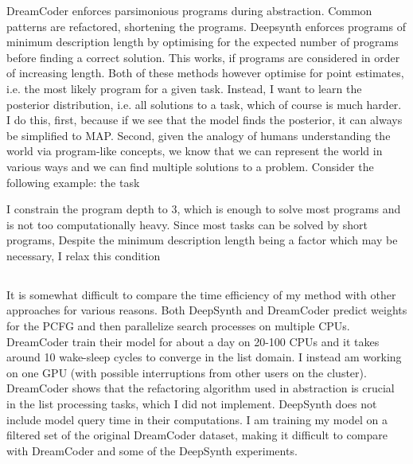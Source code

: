 
DreamCoder enforces parsimonious programs during abstraction. Common patterns are refactored, shortening the programs. Deepsynth enforces programs of minimum description length by optimising for the expected number of programs before finding a correct solution. This works, if programs are considered in order of increasing length. Both of these methods however optimise for point estimates, i.e. the most likely program for a given task. Instead, I want to learn the posterior distribution, i.e. all solutions to a task, which of course is much harder.
I do this, first, because if we see that the model finds the posterior, it can always be simplified to MAP. Second, given the analogy of humans understanding the world via program-like concepts, we know that we can represent the world in various ways and we can find multiple solutions to a problem. Consider the following example: the task 


I constrain the program depth to 3, which is enough to solve most programs and is not too computationally heavy.
Since most tasks can be solved by short programs, 
Despite the minimum description length being a factor which may be necessary, I relax this condition






\subsection{}


\subsection{}
It is somewhat difficult to compare the time efficiency of my method with other approaches for various reasons. 
Both DeepSynth and DreamCoder predict weights for the PCFG and then parallelize search processes on multiple CPUs. DreamCoder train their model for about a day on 20-100 CPUs and it takes around 10 wake-sleep cycles to converge in the list domain. I instead am working on one GPU (with possible interruptions from other users on the cluster). DreamCoder shows that the refactoring algorithm used in abstraction is crucial in the list processing tasks, which I did not implement.
DeepSynth does not include model query time in their computations.
I am training my model on a filtered set of the original DreamCoder dataset, making it difficult to compare with DreamCoder and some of the DeepSynth experiments. 

